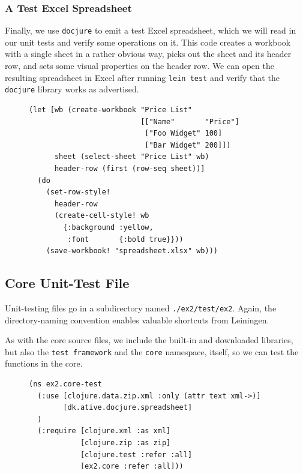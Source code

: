 \documentclass[11pt]{article}
\begin{document}
\subsubsection{A Test Excel Spreadsheet}
\label{sec-2-3-3}
Finally, we use \verb|docjure| to emit a test Excel spreadsheet, which
we will read in our unit tests and verify some operations on it. This
code creates a workbook with a single sheet in a rather obvious way,
picks out the sheet and its header row, and sets some visual
properties on the header row. We can open the resulting spreadsheet in
Excel after running \verb|lein test| and verify that the
\verb|docjure| library works as advertised.
\begin{figure}[H]
\label{docjure-test-spreadsheet}
\begin{verbatim}
(let [wb (create-workbook "Price List"
                          [["Name"       "Price"]
                           ["Foo Widget" 100]
                           ["Bar Widget" 200]])
      sheet (select-sheet "Price List" wb)
      header-row (first (row-seq sheet))]
  (do
    (set-row-style!
      header-row
      (create-cell-style! wb
        {:background :yellow,
         :font       {:bold true}}))
    (save-workbook! "spreadsheet.xlsx" wb)))
\end{verbatim}
\end{figure}
\subsection{Core Unit-Test File}
\label{sec-2-4}
Unit-testing files go in a subdirectory named \verb+./ex2/test/ex2+.
Again, the directory-naming convention enables valuable shortcuts
from Leiningen.

As with the core source files, we include the built-in and downloaded
libraries, but also the \verb|test framework| and the \verb|core|
namespace, itself, so we can test the functions in the core.
\begin{figure}[H]
\label{main-test-namespace}
\begin{verbatim}
(ns ex2.core-test
  (:use [clojure.data.zip.xml :only (attr text xml->)]
        [dk.ative.docjure.spreadsheet]
  )
  (:require [clojure.xml :as xml]
            [clojure.zip :as zip]
            [clojure.test :refer :all]
            [ex2.core :refer :all]))
\end{verbatim}
\end{figure}
\end{document}
